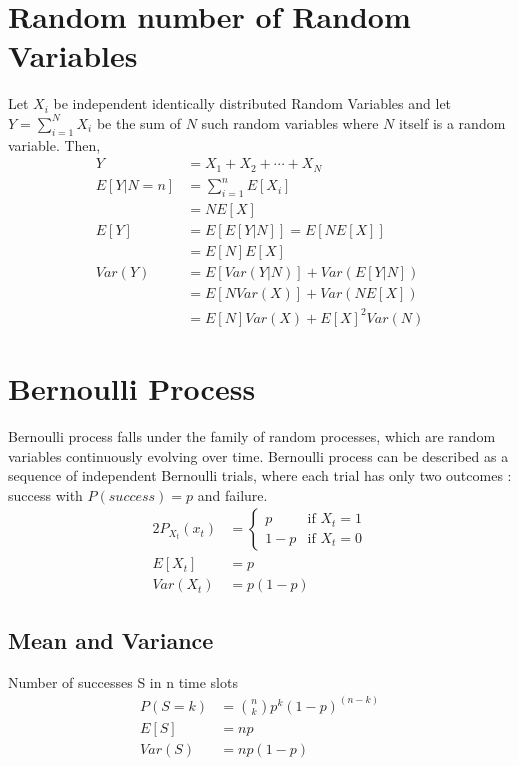 \documentclass[11pt, a4paper]{article}
\begin{document}
    \section{Random number of Random Variables}
    Let $X_{i}$ be independent identically distributed Random Variables and let $Y = \sum_{i=1}^{N} X_{i}$ be the sum of $N$ such random variables where $N$ itself is a random variable. Then,
    \begin{align*}
        Y &= X_{1} + X_{2} + \cdots + X_{N}\\
        E[Y|N=n] &= \sum_{i=1}^{n}E[X_{i}]\\
                &= NE[X]\\
        E[Y] &= E[E[Y|N]] = E[NE[X]]\\
            &= E[N]E[X] \tag*{since $E[X]$ will be a number}\\
        Var(Y) &= E[Var(Y|N)] + Var(E[Y|N])\\
            &= E[NVar(X)] + Var(NE[X])\\
            &= E[N]Var(X) + E[X]^{2}Var(N)
    \end{align*}

    \section{Bernoulli Process}
    Bernoulli process falls under the family of random processes, which are random variables continuously evolving over time. Bernoulli process can be described as a sequence of independent Bernoulli trials, where each trial has only two outcomes : success with $P(success) = p$ and failure.
    \begin{alignat*}{2}
        P_{X_{t}}(x_{t}) &= \begin{cases} p &\mbox{if $X_{t} = 1$}\\
                                        1-p &\mbox{if $X_{t} = 0$} \end{cases}\\
        E[X_{t}] &= p\\
        Var(X_{t}) &= p(1-p)
    \end{alignat*}

    \subsection{Mean and Variance}
    Number of successes S in n time slots
    \begin{align*}
        P(S=k) &= \binom{n}{k} p^{k}(1-p)^(n-k)\\
        E[S] &= np\\
        Var(S) &= np(1-p)
    \end{align*}
\end{document}
